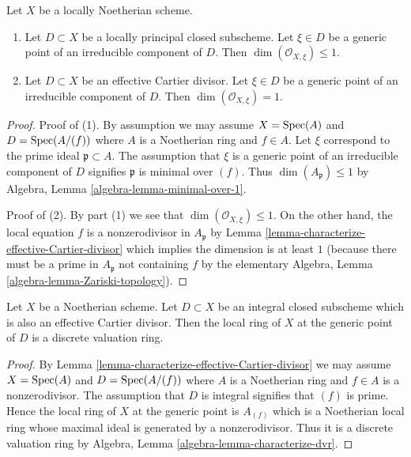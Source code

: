 \begin{lemma}
\label{lemma-effective-Cartier-codimension-1}
Let $X$ be a locally Noetherian scheme.
\begin{enumerate}
\item Let $D \subset X$ be a locally principal closed subscheme.
Let $\xi \in D$ be a generic point of an irreducible component of $D$.
Then $\dim(\mathcal{O}_{X, \xi}) \leq 1$.
\item Let $D \subset X$ be an effective Cartier divisor.
Let $\xi \in D$ be a generic point of an irreducible component of $D$.
Then $\dim(\mathcal{O}_{X, \xi}) = 1$.
\end{enumerate}
\end{lemma}

\begin{proof}
Proof of (1). By assumption we may assume $X = \mathop{\mathrm{Spec}}(A)$ and
$D = \mathop{\mathrm{Spec}}(A/(f))$ where $A$ is a Noetherian ring and $f \in A$.
Let $\xi$ correspond to the prime ideal $\mathfrak p \subset A$.
The assumption that $\xi$ is a generic point of an irreducible
component of $D$ signifies $\mathfrak p$ is minimal over $(f)$.
Thus $\dim(A_\mathfrak p) \leq 1$ by
Algebra, Lemma \ref{algebra-lemma-minimal-over-1}.

\medskip\noindent
Proof of (2). By part (1) we see that $\dim(\mathcal{O}_{X, \xi}) \leq 1$.
On the other hand, the local equation $f$ is a nonzerodivisor in
$A_\mathfrak p$ by Lemma \ref{lemma-characterize-effective-Cartier-divisor}
which implies the dimension is at least $1$ (because there must be a
prime in $A_\mathfrak p$ not containing $f$ by the elementary
Algebra, Lemma \ref{algebra-lemma-Zariski-topology}).
\end{proof}

\begin{lemma}
\label{lemma-integral-effective-Cartier-divisor-dvr}
Let $X$ be a Noetherian scheme. Let $D \subset X$ be an
integral closed subscheme which is also an
effective Cartier divisor. Then the local ring of $X$
at the generic point of $D$ is a discrete valuation ring.
\end{lemma}

\begin{proof}
By Lemma \ref{lemma-characterize-effective-Cartier-divisor}
we may assume $X = \mathop{\mathrm{Spec}}(A)$ and $D = \mathop{\mathrm{Spec}}(A/(f))$
where $A$ is a Noetherian ring and $f \in A$ is a nonzerodivisor.
The assumption that $D$ is integral signifies that $(f)$ is prime.
Hence the local ring of $X$ at the generic point is $A_{(f)}$
which is a Noetherian local ring whose maximal ideal is generated by
a nonzerodivisor. Thus it is a discrete valuation ring by
Algebra, Lemma \ref{algebra-lemma-characterize-dvr}.
\end{proof}

